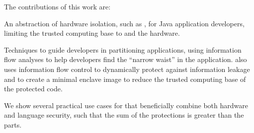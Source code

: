 The contributions of this work are:
\begin{compactitem}
\item An abstraction of hardware isolation, such as \sgx{}, for Java application developers, limiting the trusted computing base to \sysname{} and the hardware.  
\item Techniques to guide developers in partitioning applications, using information flow analyses to help developers find the ``narrow waist'' in the application.  \sysname{} also uses information flow control to dynamically protect against information leakage %
and
to create a minimal enclave image to reduce the trusted computing base of the protected code.
\item We show several practical use cases for \sysname{} that beneficially combine both hardware and language security,
such that the sum of the protections is greater than the parts.

\end{compactitem}

